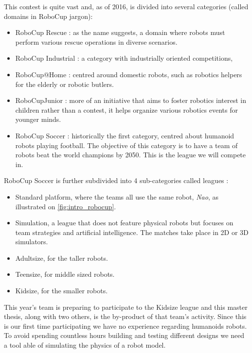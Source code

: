 This contest is quite vast and, as of 2016, is divided into several categories (called domains in RoboCup jargon):
\begin{itemize}
\item RoboCup Rescue : as the name suggests, a domain where robots must perform various rescue operations in diverse scenarios.
\item RoboCup Industrial : a category with industrially oriented competitions, 
\item RoboCup@Home : centred around domestic robots, such as robotics helpers for the elderly or robotic butlers.
\item RoboCupJunior : more of an initiative that aims to foster robotics interest in children rather than a contest, it helps organize various robotics events for younger minds.
\item RoboCup Soccer : historically the first category, centred about humanoid robots playing football. The objective of this category is to have a team of robots beat the world champions by 2050. This is the league we will compete in.
\end{itemize}

RoboCup Soccer is further subdivided into 4 sub-categories called leagues :\begin{itemize}
\item Standard platform, where the teams all use the same robot, \emph{Nao}, as illustrated on \cref{fig:intro_robocup}.
\item Simulation, a league that does not feature physical robots but focuses on team strategies and artificial intelligence. The matches take place in 2D or 3D simulators.
\item Adultsize, for the taller robots.
\item Teensize, for middle sized robots.
\item Kidsize, for the smaller robots.
\end{itemize}

This year's team is preparing to participate to the Kidsize league and this master thesis, along with two others, is the by-product of that team's activity. Since this is our first time participating we have no experience regarding humanoids robots. To avoid spending countless hours building and testing different designs we need a tool able of simulating the physics of a robot model. 

